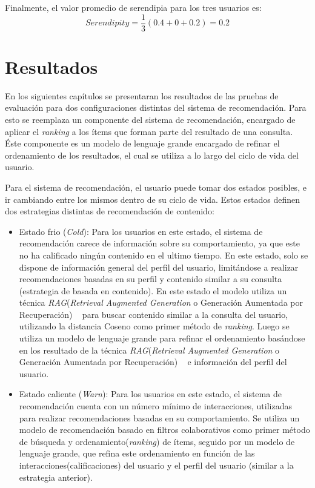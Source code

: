 \documentclass[11pt,a4paper,twoside]{thesis}
\begin{document}
Finalmente, el valor promedio de serendipia para los tres usuarios es:
\[
	Serendipity = \frac{1}{3} (0.4 + 0 + 0.2) = 0.2
\]


\chapter{Resultados}

En los siguientes capítulos se presentaran los resultados de las pruebas de evaluación para dos configuraciones distintas del sistema de recomendación. Para esto se reemplaza un componente del sistema de recomendación, encargado de aplicar el \textit{ranking} a los ítems que forman parte del resultado de una consulta. Éste componente es un modelo de lenguaje grande  encargado de refinar el ordenamiento de los resultados, el cual se utiliza a lo largo del ciclo de vida del usuario.

Para el sistema de recomendación, el usuario puede tomar dos estados posibles, e ir cambiando entre los mismos dentro de su ciclo de vida. Estos estados definen dos estrategias distintas de recomendación de contenido:

\begin{itemize}
	\item Estado frio (\textit{Cold}): Para los usuarios en este estado, el sistema de recomendación carece de información sobre su comportamiento, ya que este no ha calificado ningún contenido en el ultimo tiempo. En este estado, solo se dispone de información general del perfil del usuario, limitándose a realizar
	      recomendaciones basadas en su perfil y contenido similar a su consulta (estrategia de basada en contenido). En este estado el modelo utiliza un técnica \textit{RAG}(\textit{Retrieval Augmented Generation} o Generación Aumentada por Recuperación) ~\cite{rag} para buscar contenido similar a la consulta del usuario, utilizando la distancia Coseno como primer método de \textit{ranking}. Luego se utiliza un modelo de lenguaje grande para refinar el ordenamiento basándose en los resultado de la técnica \textit{RAG}(\textit{Retrieval Augmented Generation} o Generación Aumentada por Recuperación) ~\cite{rag} e información del perfil del usuario.
	\item Estado caliente (\textit{Warn}): Para los usuarios en este estado, el sistema de recomendación cuenta con un número mínimo de interacciones, utilizadas para realizar recomendaciones basadas en su comportamiento. Se utiliza un modelo de recomendación basado en filtros colaborativos como primer método de búsqueda y ordenamiento(\textit{ranking}) de ítems, seguido por un modelo de lenguaje grande, que refina este ordenamiento en función de las interacciones(calificaciones) del usuario y el perfil del usuario (similar a la estrategia anterior).
\end{itemize}
\end{document}
